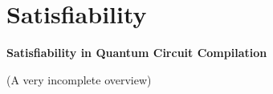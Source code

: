 \section{Satisfiability}


\begin{frame}[noframenumbering]
	
\vfill
\centering

\vspace{-.5cm}\textbf{\Large Satisfiability in Quantum Circuit Compilation}\vspace{-.5cm}

\vfill

\centering
\alert{(A very incomplete overview)}

\end{frame}



